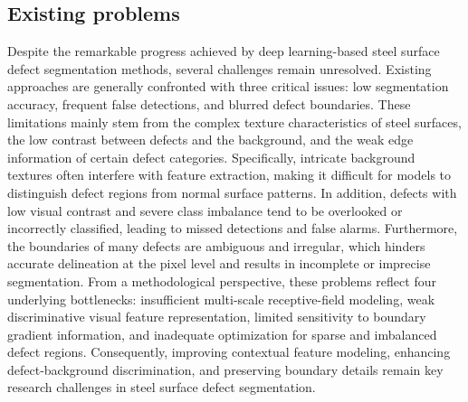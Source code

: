 \documentclass[sn-basic]{sn-jnl}
\theoremstyle{thmstyleone}%
\theoremstyle{thmstyletwo}%
\theoremstyle{thmstylethree}%
\begin{document}
\subsection{Existing problems}
Despite the remarkable progress achieved by deep learning-based steel surface defect segmentation methods, several challenges remain unresolved. Existing approaches are generally confronted with three critical issues: low segmentation accuracy, frequent false detections, and blurred defect boundaries. These limitations mainly stem from the complex texture characteristics of steel surfaces, the low contrast between defects and the background, and the weak edge information of certain defect categories. Specifically, intricate background textures often interfere with feature extraction, making it difficult for models to distinguish defect regions from normal surface patterns. In addition, defects with low visual contrast and severe class imbalance tend to be overlooked or incorrectly classified, leading to missed detections and false alarms. Furthermore, the boundaries of many defects are ambiguous and irregular, which hinders accurate delineation at the pixel level and results in incomplete or imprecise segmentation. From a methodological perspective, these problems reflect four underlying bottlenecks: insufficient multi-scale receptive-field modeling, weak discriminative visual feature representation, limited sensitivity to boundary gradient information, and inadequate optimization for sparse and imbalanced defect regions. Consequently, improving contextual feature modeling, enhancing defect-background discrimination, and preserving boundary details remain key research challenges in steel surface defect segmentation.
\end{document}
